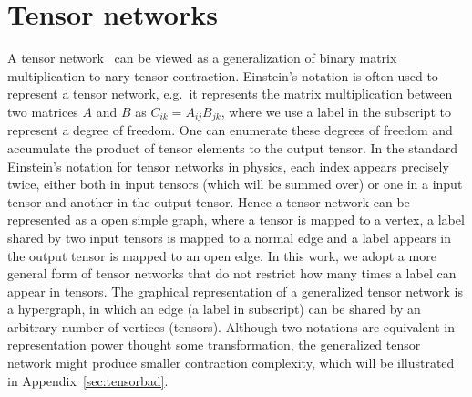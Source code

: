 \documentclass[onefignum, onetabnum]{siamart190516}
\newcommand{\<}{\langle}
\renewcommand{\>}{\rangle}
\newcommand{\App}[1]{Appendix~\ref{#1}}
\begin{document}
\section{Tensor networks}\label{sec:tn}
A tensor network~\cite{Cirac2020, Orus2014} can be viewed as a generalization of binary matrix multiplication to nary tensor contraction.
Einstein's notation is often used to represent a tensor network, e.g.\ it represents the matrix multiplication between two matrices $A$ and $B$ as $C_{ik} = A_{ij}B_{jk}$,
where we use a label in the subscript to represent a degree of freedom.
One can enumerate these degrees of freedom and accumulate the product of tensor elements to the output tensor.
In the standard Einstein's notation for tensor networks in physics, each index appears precisely twice, either both in input tensors (which will be summed over) or one in a input tensor and another in the output tensor.
Hence a tensor network can be represented as a open simple graph,
where a tensor is mapped to a vertex, a label shared by two input tensors is mapped to a normal edge and a label appears in the output tensor is mapped to an open edge.
In this work, we adopt a more general form of tensor networks that do not restrict how many times a label can appear in tensors. 
The graphical representation of a generalized tensor network is a hypergraph, in which an edge (a label in subscript) can be shared by an arbitrary number of vertices (tensors).
Although two notations are equivalent in representation power thought some transformation,
the generalized tensor network might produce smaller contraction complexity,
which will be illustrated in \App{sec:tensorbad}.
\end{document}
